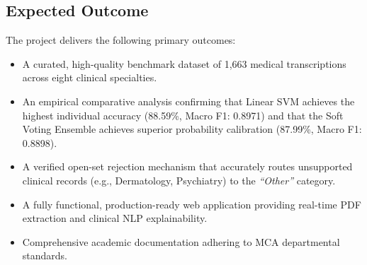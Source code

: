 \subsection{Expected Outcome}
The project delivers the following primary outcomes:
\begin{itemize}
    \item A curated, high-quality benchmark dataset of 1,663 medical transcriptions across eight clinical specialties.
    \item An empirical comparative analysis confirming that Linear SVM achieves the highest individual accuracy (88.59\%, Macro F1: 0.8971) and that the Soft Voting Ensemble achieves superior probability calibration (87.99\%, Macro F1: 0.8898).
    \item A verified open-set rejection mechanism that accurately routes unsupported clinical records (e.g., Dermatology, Psychiatry) to the \textit{``Other''} category.
    \item A fully functional, production-ready web application providing real-time PDF extraction and clinical NLP explainability.
    \item Comprehensive academic documentation adhering to MCA departmental standards.
\end{itemize}
